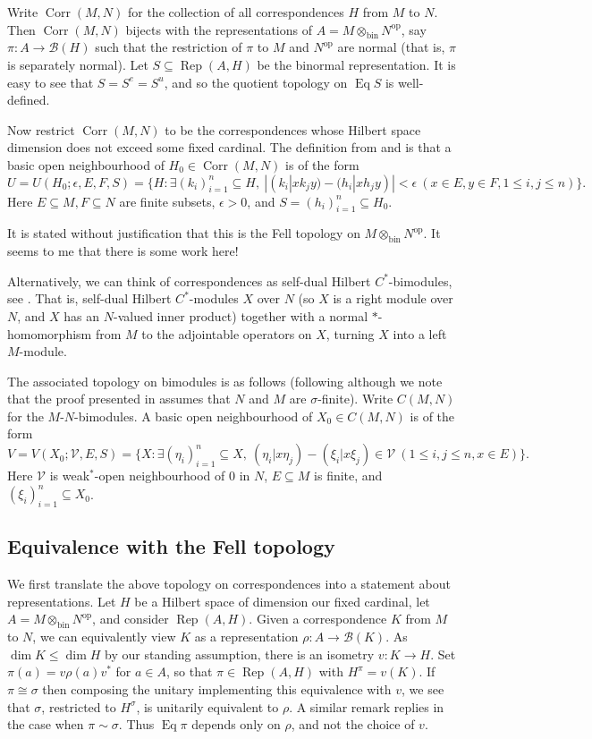 \documentclass[a4paper,11pt]{article}
\newcommand{\mc}[1]{{\mathcal{#1}}}
\newcommand{\Rep}{\operatorname{Rep}}
\newcommand{\Eq}{\operatorname{Eq}}
\newcommand{\op}{{\operatorname{op}}}
\newcommand{\bin}{{\operatorname{bin}}}
\newcommand{\Corr}{{\operatorname{Corr}}}
\begin{document}
Write $\Corr(M,N)$ for the collection of all correspondences $H$ from $M$ to
$N$.  Then $\Corr(M,N)$ bijects with the representations of $A = 
M\otimes_\bin N^\op$, say $\pi:A\rightarrow\mc B(H)$ such that the restriction
of $\pi$ to $M$ and $N^\op$ are normal (that is, $\pi$ is separately normal).
Let $S\subseteq\Rep(A,H)$ be the binormal representation.  It is easy to see
that $S = S^e = S^u$, and so the quotient topology on $\Eq S$ is well-defined.

Now restrict $\Corr(M,N)$ to be the correspondences whose Hilbert space
dimension does not exceed some fixed cardinal.
The definition from \cite{cj} and \cite[Section~1.12]{ad2} is that a basic
open neighbourhood of $H_0\in\Corr(M,N)$ is of the form
\[ U=U(H_0; \epsilon,E,F,S) =
\big\{ H : \exists (k_i)_{i=1}^n\subseteq H, \ 
|(k_i|xk_jy) - (h_i|xh_jy)|<\epsilon \ 
(x\in E, y\in F, 1\leq i,j\leq n)
\big\}. \]
Here $E\subseteq M, F\subseteq N$ are finite subsets, $\epsilon>0$, and
$S=(h_i)_{i=1}^n \subseteq H_0$.

It is stated without justification that this is the Fell topology on
$M\otimes_\bin N^\op$.  It seems to me that there is some work here!

Alternatively, we can think of correspondences as self-dual Hilbert 
$C^*$-bimodules, see \cite{ad1, ad2}.  That is, self-dual Hilbert $C^*$-modules
$X$ over $N$ (so $X$ is a right module over $N$, and $X$ has an $N$-valued
inner product) together with a normal $*$-homomorphism from $M$ to the
adjointable operators on $X$, turning $X$ into a left $M$-module.

The associated topology on bimodules is as follows (following
\cite[Section~1.12]{ad2} although we note that the proof presented in \cite{ad2}
assumes that $N$ and $M$ are $\sigma$-finite).  Write $C(M,N)$ for the
$M$-$N$-bimodules.  A basic
open neighbourhood of $X_0\in C(M,N)$ is of the form
\[ V=V(X_0; \mc V, E,S) = \big\{
X : \exists(\eta_i)_{i=1}^n\subseteq X, \ 
(\eta_i|x\eta_j) - (\xi_i|x\xi_j) \in\mc V \ 
(1\leq i,j\leq n, x\in E)
\big\}. \]
Here $\mc V$ is weak$^*$-open neighbourhood of $0$ in $N$, $E\subseteq M$ is
finite, and $(\xi_i)_{i=1}^n \subseteq X_0$.


\subsection{Equivalence with the Fell topology}

We first translate the above topology on correspondences into a statement about
representations.  Let $H$ be a Hilbert space of dimension our fixed cardinal,
let $A = M \otimes_{\bin} N^\op$, and consider $\Rep(A,H)$.  Given a
correspondence $K$ from $M$ to $N$, we can equivalently view $K$ as a
representation $\rho : A\rightarrow\mc B(K)$.  As $\dim K\leq \dim H$ by our
standing assumption, there is an isometry $v:K\rightarrow H$.  Set $\pi(a)
= v\rho(a)v^*$ for $a\in A$, so that $\pi\in\Rep(A,H)$ with $H^\pi = v(K)$.
If $\pi\cong\sigma$ then composing the unitary implementing this equivalence
with $v$, we see that $\sigma$, restricted to $H^\sigma$, is unitarily
equivalent to $\rho$.  A similar remark replies in the case when $\pi\sim\sigma$.
Thus $\Eq\pi$ depends only on $\rho$, and not the choice of $v$.
\end{document}
